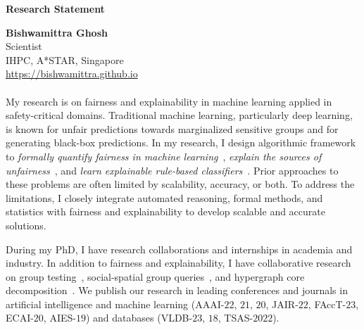 \documentclass[10pt]{article}
\newcommand{\blue}[1]{\textcolor{blue}{#1}}
\begin{document}
	\begin{center}
		\large\textbf{Research Statement} 
	\end{center}
	\textbf{Bishwamittra Ghosh}\\		
	\noindent Scientist\\
	IHPC, A*STAR, Singapore\\
	\blue{\url{https://bishwamittra.github.io}}



	\paragraph{}
	My research is on fairness and explainability in machine learning applied in safety-critical domains. Traditional machine learning, particularly deep learning, is known for  unfair predictions towards marginalized sensitive groups and for generating black-box predictions. In my research, I design algorithmic framework to \textit{formally quantify fairness in machine learning}~\cite{ghosh2021justicia, ghosh2022algorithmic}, \textit{explain the sources of unfairness}~\cite{ghosh2022how}, and \textit{learn explainable rule-based classifiers}~\cite{ghosh22efficient, ghosh2019incremental, ghosh2020classification}. Prior approaches to these problems are often limited by scalability, accuracy, or both. To address the limitations, I closely integrate automated reasoning, formal methods, and statistics with fairness and explainability to develop scalable and accurate solutions.
	
	

	
	
	During my PhD, I have  research collaborations and internships in academia and industry. In addition to fairness and explainability, I have collaborative research on  group testing~\cite{ciampiconi2020maxsat}, social-spatial group queries~\cite{ghosh2018flexible, apon2021social}, and hypergraph core decomposition~\cite{arafat2023neighborhood}. We publish our research in leading conferences and journals in artificial intelligence and machine learning (AAAI-$22$, $21$, $20$, JAIR-$22$, FAccT-$ 23 $, ECAI-$20$, AIES-$19$) and databases (VLDB-$23$, $18$, TSAS-$2022$).
	
	
	
	
	
	
\end{document}
